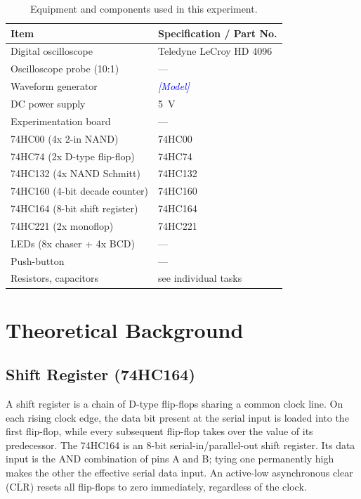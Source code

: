 \documentclass[12pt, a4paper]{article}
\newcommand{\enter}[1]{\textcolor{blue}{\textit{[#1]}}}
\begin{document}
\begin{table}[H]
  \centering
  \caption{Equipment and components used in this experiment.}
  \label{tab:equipment}
  \begin{tabular}{ll}
    \toprule
    Item & Specification / Part No. \\
    \midrule
    Digital oscilloscope          & Teledyne LeCroy HD 4096 \\
    Oscilloscope probe (10:1)     & --- \\
    Waveform generator            & \enter{Model} \\
    DC power supply               & \SI{5}{\volt} \\
    Experimentation board         & --- \\
    74HC00 (4x 2-in NAND)         & 74HC00 \\
    74HC74 (2x D-type flip-flop)  & 74HC74 \\
    74HC132 (4x NAND Schmitt)     & 74HC132 \\
    74HC160 (4-bit decade counter)& 74HC160 \\
    74HC164 (8-bit shift register)& 74HC164 \\
    74HC221 (2x monoflop)         & 74HC221 \\
    LEDs (8x chaser + 4x BCD)     & --- \\
    Push-button                   & --- \\
    Resistors, capacitors         & see individual tasks \\
    \bottomrule
  \end{tabular}
\end{table}

\section{Theoretical Background}

\subsection{Shift Register (74HC164)}

A shift register is a chain of D-type flip-flops sharing a common clock line.
On each rising clock edge, the data bit present at the serial input is loaded into
the first flip-flop, while every subsequent flip-flop takes over the value of its
predecessor.
The 74HC164 is an 8-bit serial-in/parallel-out shift register.
Its data input is the AND combination of pins A and B; tying one permanently high
makes the other the effective serial data input.
An active-low asynchronous clear ($\overline{\text{CLR}}$) resets all flip-flops to
zero immediately, regardless of the clock.
\end{document}
